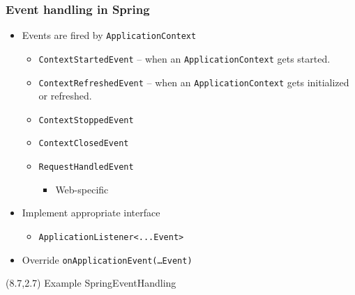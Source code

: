 \documentclass[10pt,xcolor=pdflatex, table]{beamer}
\begin{document}
\begin{frame}[fragile]\frametitle{Event handling in Spring}
	\begin{itemize}
		\item Events are fired by \texttt{ApplicationContext}
        \begin{itemize}
        	\item \texttt{ContextStartedEvent} -- when an \texttt{ApplicationContext} gets started.
        	\item \texttt{ContextRefreshedEvent} -- when an \texttt{ApplicationContext} gets initialized or refreshed.
        	\item \texttt{ContextStoppedEvent}
        	\item \texttt{ContextClosedEvent}
        	\item \texttt{RequestHandledEvent}
            \begin{itemize}
            	\item Web-specific
            \end{itemize}
        \end{itemize}
		\item Implement appropriate interface\\
        \begin{itemize}
        	\item \verb'ApplicationListener<...Event>'
        \end{itemize}
		\item Override \texttt{onApplicationEvent(\ldots Event)}
	\end{itemize}
\begin{textblock}{15}(8.7,2.7)
    {\footnotesize Example SpringEventHandling}
\end{textblock}
\end{frame}
\end{document}
